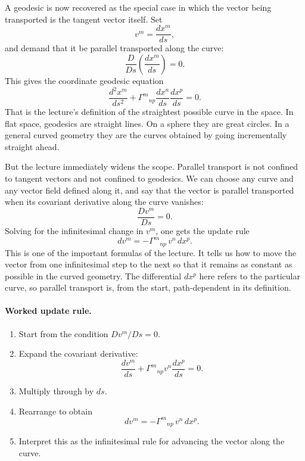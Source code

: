 A geodesic is now recovered as the special case in which the vector being transported is the tangent vector itself. Set
\[
v^{m}=\frac{dx^{m}}{ds},
\]
and demand that it be parallel transported along the curve:
\begin{equation}
\frac{D}{Ds}\left(\frac{dx^{m}}{ds}\right)=0.
\end{equation}
This gives the coordinate geodesic equation
\begin{equation}
\frac{d^{2}x^{m}}{ds^{2}}
+
\Gamma^{m}{}_{np}\frac{dx^{n}}{ds}\frac{dx^{p}}{ds}
=0.
\end{equation}
That is the lecture's definition of the straightest possible curve in the space. In flat space, geodesics are straight lines. On a sphere they are great circles. In a general curved geometry they are the curves obtained by going incrementally straight ahead.

But the lecture immediately widens the scope. Parallel transport is not confined to tangent vectors and not confined to geodesics. We can choose any curve and any vector field defined along it, and say that the vector is parallel transported when its covariant derivative along the curve vanishes:
\begin{equation}
\frac{D v^{m}}{Ds}=0.
\end{equation}
Solving for the infinitesimal change in \(v^{m}\), one gets the update rule
\begin{equation}
dv^{m}=-\Gamma^{m}{}_{np}\,v^{n}\,dx^{p}.
\end{equation}
This is one of the important formulas of the lecture. It tells us how to move the vector from one infinitesimal step to the next so that it remains as constant as possible in the curved geometry. The differential \(dx^{p}\) here refers to the particular curve, so parallel transport is, from the start, path-dependent in its definition.

\paragraph{Worked update rule.}
\begin{enumerate}
\item Start from the condition \(D v^{m}/Ds=0\).
\item Expand the covariant derivative:
\[
\frac{dv^{m}}{ds}
+
\Gamma^{m}{}_{np}v^{n}\frac{dx^{p}}{ds}
=0.
\]
\item Multiply through by \(ds\).
\item Rearrange to obtain
\[
dv^{m}=-\Gamma^{m}{}_{np}\,v^{n}\,dx^{p}.
\]
\item Interpret this as the infinitesimal rule for advancing the vector along the curve.
\end{enumerate}

